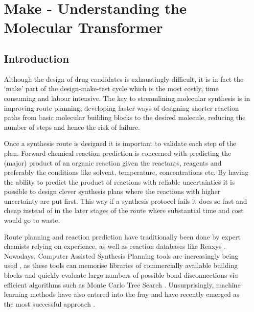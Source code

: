 
\chapter{Make - Understanding the Molecular Transformer}
\label{chap:MolTrans}
\section{Introduction}
\label{sec:int}
Although the design of drug candidates is exhaustingly difficult, it is in fact the `make' part of the design-make-test cycle which is the most costly, time consuming and labour intensive. The key to streamlining molecular synthesis is in improving route planning, developing faster ways of designing shorter reaction paths from basic molecular building blocks to the desired molecule, reducing the number of steps and hence the risk of failure.

Once a synthesis route is designed it is important to validate each step of the plan. Forward chemical reaction prediction is concerned with predicting the (major) product of an organic reaction given the reactants, reagents and preferably the conditions like solvent, temperature, concentrations etc. By having the ability to predict the product of reactions with reliable uncertainties it is possible to design clever synthesis plans where the reactions with higher uncertainty are put first. This way if a synthesis protocol fails it does so fast and cheap instead of in the later stages of the route where substantial time and cost would go to waste.

Route planning and reaction prediction have traditionally been done by expert chemists relying on experience, as well as reaction databases like Reaxys \cite{ElsevierReaxysDatabase}. Nowadays, Computer Assisted Synthesis Planning tools are increasingly being used \cite{Coley2018}, as these tools can memorise libraries of commercially available building blocks and quickly evaluate large numbers of possible bond disconnections via efficient algorithms such as Monte Carlo Tree Search \cite{Segler2018PlanningAIb}. Unsurprisingly, machine learning methods have also entered into the fray \cite{Coley2019AutonomousOutlook, Coley2019AutonomousProgress} and have recently emerged as the most successful approach \cite{Coley2018, Schwaller2019MolecularPrediction}.

